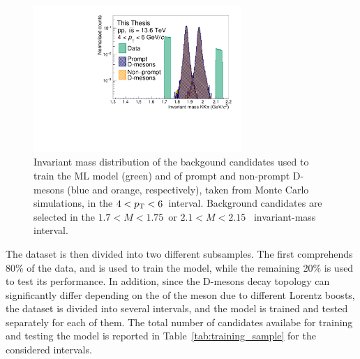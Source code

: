 \begin{figure}[htb]
    \centering
    \includegraphics[width=0.7\textwidth]{Figures/Chapter 5/Mass.pdf}
    \caption{Invariant mass distribution of the backgound candidates used to train the ML model (green) and of prompt and non-prompt D-mesons (blue and orange, respectively), taken from Monte Carlo simulations, in the $4<p\mathrm{_T}<6$~\gevc interval. Background candidates are selected in the $1.7 < M < 1.75$~\gevcc or \mbox{$2.1 < M < 2.15$~\gevcc} invariant-mass interval.}
    \label{fig:ml_training_mass}
\end{figure}

The dataset is then divided into two different subsamples. The first comprehends 80\% of the data, and is used to train the model, while the remaining 20\% is used to test its performance. In addition, since the D-mesons decay topology can significantly differ depending on the \pt of the meson due to different Lorentz boosts, the dataset is divided into several \pt intervals, and the model is trained and tested separately for each of them. The total number of candidates availabe for training and testing the model is reported in Table~\ref{tab:training_sample} for the considered \pt intervals.


